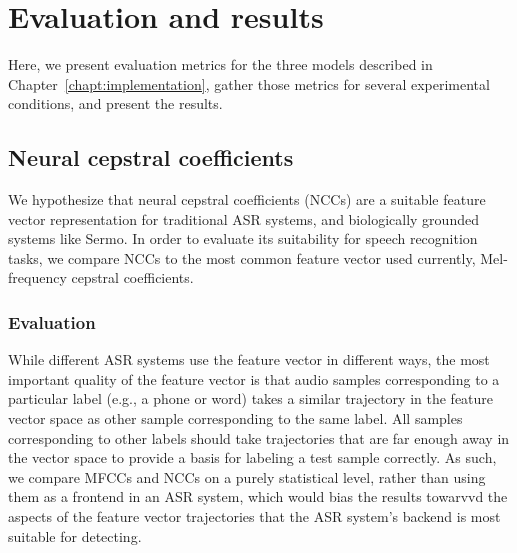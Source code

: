 \chapter{Evaluation and results}
\label{chapt:results}




Here,
we present evaluation metrics for the three models
described in Chapter~\ref{chapt:implementation},
gather those metrics
for several experimental conditions,
and present the results.

\section{Neural cepstral coefficients}

We hypothesize that
neural cepstral coefficients (NCCs)
are a suitable feature vector representation
for traditional ASR systems,
and biologically grounded systems like Sermo.
In order to evaluate
its suitability for speech recognition tasks,
we compare NCCs to the most common
feature vector used currently,
Mel-frequency cepstral coefficients.

\subsection{Evaluation}

While different ASR systems
use the feature vector in different ways,
the most important quality of the feature vector
is that audio samples corresponding
to a particular label
(e.g., a phone or word)
takes a similar trajectory
in the feature vector space
as other sample corresponding to the same label.
All samples corresponding to other labels
should take trajectories that are
far enough away in the vector space
to provide a basis for labeling
a test sample correctly.
As such, we compare MFCCs and NCCs
on a purely statistical level,
rather than using them as a frontend
in an ASR system,
which would bias the results
towarvvd the aspects of the
feature vector trajectories
that the ASR system's backend
is most suitable for detecting.

